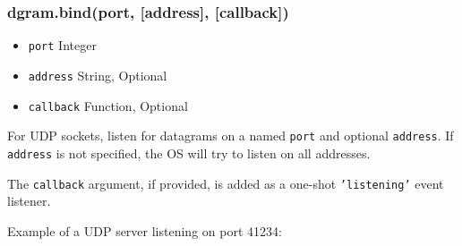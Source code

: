 \subsubsection{dgram.bind(port, {[}address{]}, {[}callback{]})}

\begin{itemize}
\item
  \texttt{port} Integer
\item
  \texttt{address} String, Optional
\item
  \texttt{callback} Function, Optional
\end{itemize}

For UDP sockets, listen for datagrams on a named \texttt{port} and
optional \texttt{address}. If \texttt{address} is not specified, the OS
will try to listen on all addresses.

The \texttt{callback} argument, if provided, is added as a one-shot
\texttt{'listening'} event listener.

Example of a UDP server listening on port 41234:

\begin{Shaded}
\begin{Highlighting}[]
 \NormalTok{);}

 \NormalTok{(}\NormalTok{);}

\NormalTok{(}\NormalTok{, } 
  \NormalTok{(}  \NormalTok{+}
     \NormalTok{+ } \NormalTok{+ }\NormalTok{);}
\NormalTok{\});}

\NormalTok{(}\NormalTok{, } \NormalTok{() \{}
   \NormalTok{();}
  \NormalTok{(} \NormalTok{+}
       \NormalTok{+ } \NormalTok{+ }\NormalTok{);}
\NormalTok{\});}

\NormalTok{(}\NormalTok{);}
\end{Highlighting}
\end{Shaded}

